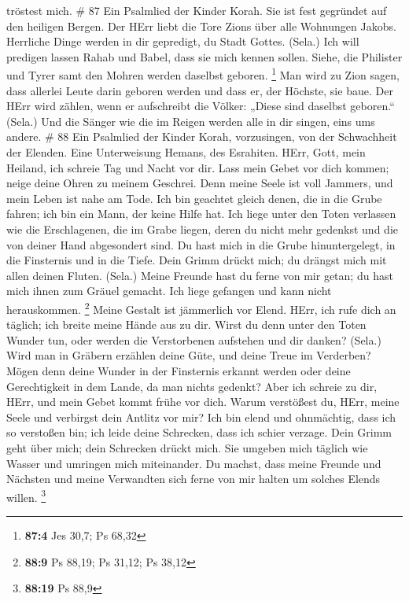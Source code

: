 tröstest mich. \# 87  Ein Psalmlied der Kinder Korah. Sie
ist fest gegründet auf den heiligen Bergen.  Der HErr liebt
die Tore Zions über alle Wohnungen Jakobs.  Herrliche Dinge
werden in dir gepredigt, du Stadt Gottes. (Sela.)  Ich will
predigen lassen Rahab und Babel, dass sie mich kennen sollen. Siehe, die
Philister und Tyrer samt den Mohren werden daselbst geboren. \footnote{\textbf{87:4}
  Jes 30,7; Ps 68,32}  Man wird zu Zion sagen, dass allerlei
Leute darin geboren werden und dass er, der Höchste, sie baue.
 Der HErr wird zählen, wenn er aufschreibt die Völker:
„Diese sind daselbst geboren.`` (Sela.)  Und die Sänger wie
die im Reigen werden alle in dir singen, eins ums andere. \# 88
 Ein Psalmlied der Kinder Korah, vorzusingen, von der
Schwachheit der Elenden. Eine Unterweisung Hemans, des Esrahiten.
 HErr, Gott, mein Heiland, ich schreie Tag und Nacht vor
dir.  Lass mein Gebet vor dich kommen; neige deine Ohren zu
meinem Geschrei.  Denn meine Seele ist voll Jammers, und
mein Leben ist nahe am Tode.  Ich bin geachtet gleich denen,
die in die Grube fahren; ich bin ein Mann, der keine Hilfe hat.
 Ich liege unter den Toten verlassen wie die Erschlagenen,
die im Grabe liegen, deren du nicht mehr gedenkst und die von deiner
Hand abgesondert sind.  Du hast mich in die Grube
hinuntergelegt, in die Finsternis und in die Tiefe.  Dein
Grimm drückt mich; du drängst mich mit allen deinen Fluten. (Sela.)
 Meine Freunde hast du ferne von mir getan; du hast mich
ihnen zum Gräuel gemacht. Ich liege gefangen und kann nicht
herauskommen. \footnote{\textbf{88:9} Ps 88,19; Ps 31,12; Ps 38,12}
 Meine Gestalt ist jämmerlich vor Elend. HErr, ich rufe
dich an täglich; ich breite meine Hände aus zu dir.  Wirst
du denn unter den Toten Wunder tun, oder werden die Verstorbenen
aufstehen und dir danken? (Sela.)  Wird man in Gräbern
erzählen deine Güte, und deine Treue im Verderben?  Mögen
denn deine Wunder in der Finsternis erkannt werden oder deine
Gerechtigkeit in dem Lande, da man nichts gedenkt?  Aber
ich schreie zu dir, HErr, und mein Gebet kommt frühe vor dich.
 Warum verstößest du, HErr, meine Seele und verbirgst dein
Antlitz vor mir?  Ich bin elend und ohnmächtig, dass ich so
verstoßen bin; ich leide deine Schrecken, dass ich schier verzage.
 Dein Grimm geht über mich; dein Schrecken drückt mich.
 Sie umgeben mich täglich wie Wasser und umringen mich
miteinander.  Du machst, dass meine Freunde und Nächsten
und meine Verwandten sich ferne von mir halten um solches Elends willen.
\footnote{\textbf{88:19} Ps 88,9}

